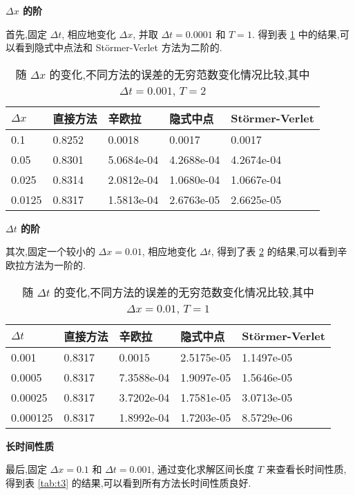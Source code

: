 \textbf{$\Delta x$ 的阶}

首先,固定 $\Delta t$, 相应地变化 $\Delta x$, 并取
$\Delta t = 0.0001$ 和 $T = 1$. 得到表 \ref{tab:dx3} 中的结果,可以看到隐式中点法和 St\"{o}rmer-Verlet 方法为二阶的.

\begin{table}[h!]
  \centering
\caption{随 $\Delta x$ 的变化,不同方法的误差的无穷范数变化情况比较,其中 $\Delta t=0.001$, $T=2$}
\begin{tabularx}{\linewidth}{XXXXX}
 \toprule[1.5pt]
 $\Delta x$ &直接方法 & 辛欧拉 & 隐式中点 & St\"{o}rmer-Verlet\\
 \midrule[1pt]
 0.1 & 0.8252 & 0.0018 & 0.0017 & 0.0017\\
 0.05 & 0.8301 & 5.0684e-04 & 4.2688e-04 & 4.2674e-04\\
 0.025 & 0.8314 & 2.0812e-04 & 1.0680e-04 & 1.0667e-04\\
 0.0125 & 0.8317 & 1.5813e-04 & 2.6763e-05 & 2.6625e-05\\
 \bottomrule[1.5pt]
\end{tabularx}
  \label{tab:dx3}
\end{table}

\textbf{$\Delta t$ 的阶}

其次,固定一个较小的 $\Delta x = 0.01$, 相应地变化 $\Delta t$, 得到了表 \ref{tab:dt3} 的结果,可以看到辛欧拉方法为一阶的.

\begin{table}[h]
  \centering
\caption{随 $\Delta t$ 的变化,不同方法的误差的无穷范数变化情况比较,其中 $\Delta x=0.01$, $T=1$}
\begin{tabularx}{\linewidth}{XXXXX}
 \toprule[1.5pt]
 $\Delta t$ &直接方法 & 辛欧拉 & 隐式中点 & St\"{o}rmer-Verlet\\
 \midrule[1pt]
 0.001 & 0.8317 & 0.0015 & 2.5175e-05 & 1.1497e-05 \\
 0.0005 & 0.8317 & 7.3588e-04 & 1.9097e-05 & 1.5646e-05 \\
 0.00025 & 0.8317 & 3.7202e-04 & 1.7581e-05 & 3.0713e-05 \\
 0.000125 & 0.8317 & 1.8992e-04 & 1.7203e-05 & 8.5729e-06 \\
 \bottomrule[1.5pt]
\end{tabularx}
  \label{tab:dt3}
\end{table}

\textbf{长时间性质}

最后,固定 $\Delta x = 0.1$ 和 $\Delta t = 0.001$, 通过变化求解区间长度 $T$ 来查看长时间性质,得到表 \ref{tab:t3} 的结果,可以看到所有方法长时间性质良好.

